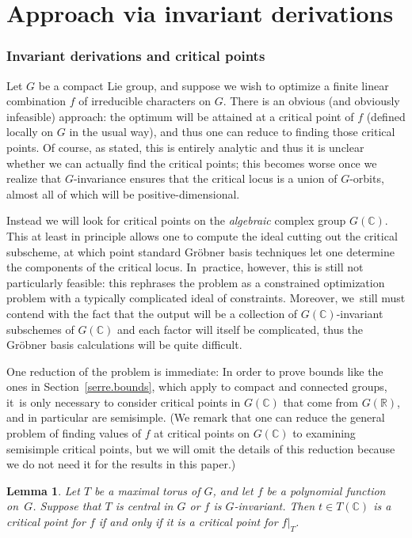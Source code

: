\documentclass[JEP,XML,SOM,Unicode,NoFloatCountersInSection,published]{cedram}
\newtheorem{lem}[equation]{Lemma}
\theoremstyle{definition}
\newcommand{\R}{\mathbb{R}}
\newcommand{\C}{\mathbb{C}}
\begin{document}
\part{Approach via invariant derivations} \label{part.Wders}

\section{Invariant derivations and critical points} \label{Wders.1}

Let $G$ be a compact Lie group, and suppose we wish to optimize a finite
linear combination $f$ of irreducible characters on $G$. There is an
obvious (and obviously infeasible) approach: the optimum will be attained
at a critical point of $f$ (defined locally on $G$ in the usual way), and
thus one can reduce to finding those critical points. Of course, as
stated, this is entirely analytic and thus it is unclear whether we can
actually find the critical points; this becomes worse once we realize that
$G$\nobreakdash-invariance ensures that the critical locus is a union of $G$-orbits,
almost all of which will be positive-dimensional.

Instead we will
look for critical points on the \emph{algebraic} complex group $G(\C)$.
This at least in principle allows one to compute the ideal cutting out the
critical subscheme, at which point standard Gröbner basis techniques let
one determine the components of the critical locus. In~practice, however,
this is still not particularly feasible: this rephrases the problem as a
constrained optimization problem with a typically complicated ideal of
constraints. Moreover, we~still must contend with the fact that the output
will be a collection of $G(\C)$-invariant subschemes of $G(\C)$ and each
factor will itself be complicated, thus the Gröbner basis
calculations will be quite difficult.

One reduction of the problem is immediate: In order to prove bounds like the ones in Section~\ref{serre.bounds}, which apply to compact and connected groups, it~is only necessary to consider critical points in $G(\C)$ that come from $G(\R)$, and in particular are semisimple.
(We remark that one can reduce the general problem of finding values of $f$ at critical points on $G(\C)$ to examining semisimple critical points, but we will omit the details of this reduction because we do not need it for the results in this paper.)

\begin{lem} \label{torus.reduce}
Let $T$ be a maximal torus of $G$, and let $f$ be a polynomial function on~$G$. Suppose that $T$ is central in $G$ or $f$ is $G$-invariant. Then $t\in T(\C)$ is a critical
point for $f$ if and only if it is a critical point for $f|_T$.
\end{lem}
\end{document}
